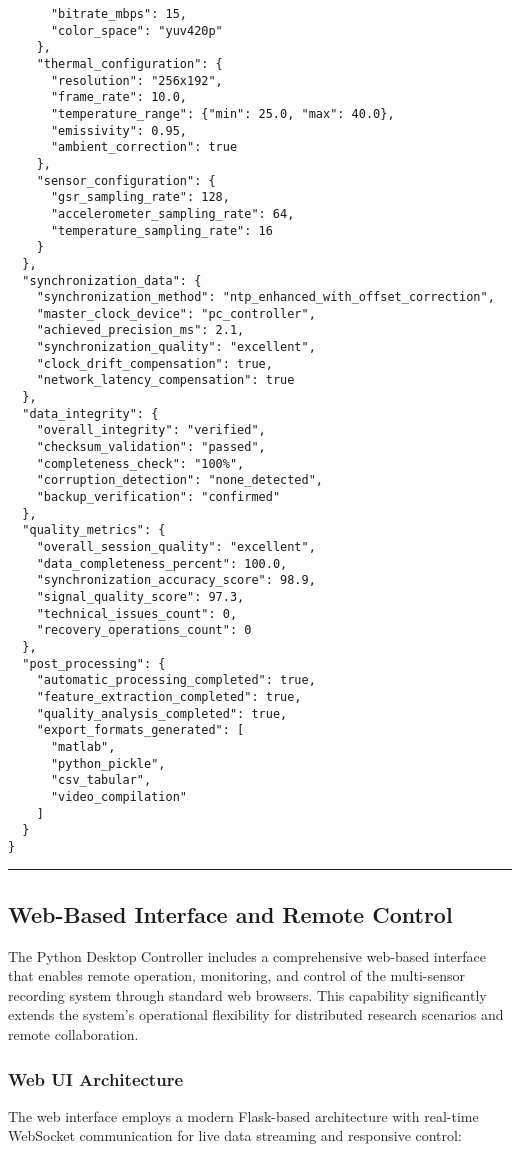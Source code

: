 \documentclass[12pt,a4paper]{article}
\begin{document}
\begin{verbatim}
      "bitrate_mbps": 15,
      "color_space": "yuv420p"
    },
    "thermal_configuration": {
      "resolution": "256x192",
      "frame_rate": 10.0,
      "temperature_range": {"min": 25.0, "max": 40.0},
      "emissivity": 0.95,
      "ambient_correction": true
    },
    "sensor_configuration": {
      "gsr_sampling_rate": 128,
      "accelerometer_sampling_rate": 64,
      "temperature_sampling_rate": 16
    }
  },
  "synchronization_data": {
    "synchronization_method": "ntp_enhanced_with_offset_correction",
    "master_clock_device": "pc_controller",
    "achieved_precision_ms": 2.1,
    "synchronization_quality": "excellent",
    "clock_drift_compensation": true,
    "network_latency_compensation": true
  },
  "data_integrity": {
    "overall_integrity": "verified",
    "checksum_validation": "passed",
    "completeness_check": "100%",
    "corruption_detection": "none_detected",
    "backup_verification": "confirmed"
  },
  "quality_metrics": {
    "overall_session_quality": "excellent",
    "data_completeness_percent": 100.0,
    "synchronization_accuracy_score": 98.9,
    "signal_quality_score": 97.3,
    "technical_issues_count": 0,
    "recovery_operations_count": 0
  },
  "post_processing": {
    "automatic_processing_completed": true,
    "feature_extraction_completed": true,
    "quality_analysis_completed": true,
    "export_formats_generated": [
      "matlab",
      "python_pickle", 
      "csv_tabular",
      "video_compilation"
    ]
  }
}
\end{verbatim}

\hrule

\subsection{Web-Based Interface and Remote Control}

The Python Desktop Controller includes a comprehensive web-based interface that enables remote operation, monitoring,
and control of the multi-sensor recording system through standard web browsers. This capability significantly extends
the system's operational flexibility for distributed research scenarios and remote collaboration.

\subsubsection{Web UI Architecture}

The web interface employs a modern Flask-based architecture with real-time WebSocket communication for live data
streaming and responsive control:
\end{document}
